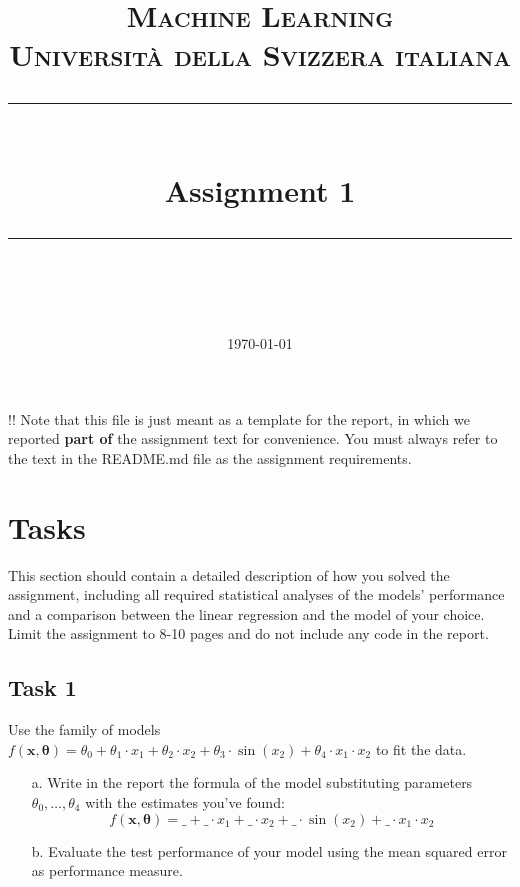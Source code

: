 \documentclass[11pt]{scrartcl}
\title{	
	\normalfont\normalsize
	\textsc{Machine Learning\\%
	Universit\`a della Svizzera italiana}\\
	\vspace{25pt}
	\rule{\linewidth}{0.5pt}\\
	\vspace{20pt}
	{\huge Assignment 1}\\
	\vspace{12pt}
	\rule{\linewidth}{1pt}\\
	\vspace{12pt}
}
\author{\LARGE \thestudent}
\date{\normalsize\today}
\begin{document}
\maketitle


\noindent !! Note that this file is just meant as a template for the report, in which we reported \textbf{part of} the assignment text for convenience. You must always refer to the text in the README.md file as the assignment requirements.


\section*{Tasks}

This section should contain a detailed description of how you solved the assignment, including all required statistical analyses of the models' performance and a comparison between the linear regression and the model of your choice. Limit the assignment to 8-10 pages and do not include any code in the report.

\subsection*{Task 1}
Use the family of models $f(\mathbf{x}, \boldsymbol{\theta}) = \theta_0 + \theta_1 \cdot x_1 + \theta_2 \cdot x_2 + \theta_3 \cdot \sin(x_2) + \theta_4 \cdot x_1 \cdot x_2$ to fit the data. 

\begin{itemize}
	\item [a.] Write in the report the formula of the model substituting parameters $\theta_0, \ldots, \theta_4$ with the estimates you've found:
	$$f(\mathbf{x}, \boldsymbol{\theta}) = \_ + \_ \cdot x_1 + \_ \cdot x_2 + \_ \cdot \sin(x_2) + \_ \cdot x_1 \cdot x_2$$
	\item [b.] Evaluate the test performance of your model using the mean squared error as performance measure.
\end{itemize}
\end{document}

